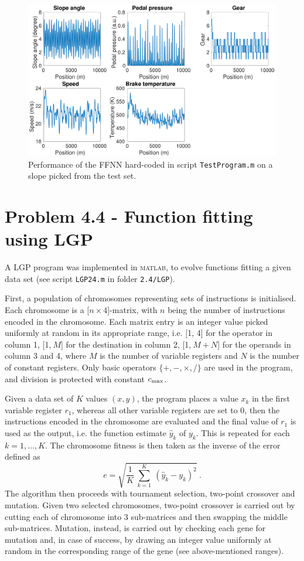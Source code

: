 \documentclass[12pt,titlepage]{article}
\begin{document}
\begin{figure}[H]
\centering
\includegraphics[width=\textwidth]{Figures/3_performance}
\caption{\footnotesize Performance of the FFNN hard-coded in script \texttt{TestProgram.m} on a slope picked from the test set.}
\label{fig:3_performance}
\end{figure}

\section*{Problem 4.4 - Function fitting using LGP}

A LGP program was implemented in \textsc{matlab}, to evolve functions fitting a given data set (see script \texttt{LGP24.m} in folder \texttt{2.4/LGP}).

First, a population of chromosomes representing sets of instructions is initialised. Each chromosome is a [$n \times 4$]-matrix, with $n$ being the number of instructions encoded in the chromosome. Each matrix entry is an integer value picked uniformly at random in its appropriate range, i.e. [1, 4] for the operator in column 1, [1,$\ M$] for the destination in column 2, [1,$\ M+N$] for the operands in column 3 and 4, where $M$ is the number of variable registers and $N$ is the number of constant registers. Only basic operators $\lbrace +, -, \times, / \rbrace$ are used in the program, and division is protected with constant $c_{\textup{max}}$.

Given a data set of $K$ values $(x, y)$, the program places a value $x_k$ in the first variable register $r_1$, whereas all other variable registers are set to 0, then the instructions encoded in the chromosome are evaluated and the final value of $r_1$ is used as the output, i.e. the function estimate $\hat{y}_k$ of $y_k$. This is repeated for each $k = 1,\ldots,K$. The chromosome fitness is then taken as the inverse of the error defined as
\[
e = \sqrt{\dfrac{1}{K} \ \sum_{k=1}^K \ ( \hat{y}_k - y_k)^2} \ .
\]
The algorithm then proceeds with tournament selection, two-point crossover and mutation. Given two selected chromosomes, two-point crossover is carried out by cutting each of chromosome into 3 sub-matrices and then swapping the middle sub-matrices.
Mutation, instead, is carried out by checking each gene for mutation and, in case of success, by drawing an integer value uniformly at random in the corresponding range of the gene (see above-mentioned ranges). 
\end{document}
